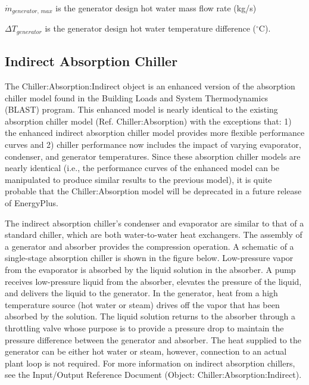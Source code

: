 \({\dot m_{generator,\,max}}\) is the generator design hot water mass flow rate (kg/s)

\(\Delta {T_{generator}}\) is the generator design hot water temperature difference (\(^{\circ}\)C).

\subsection{Indirect Absorption Chiller}\label{indirect-absorption-chiller}

The Chiller:Absorption:Indirect object is an enhanced version of the absorption chiller model found in the Building Loads and System Thermodynamics (BLAST) program. This enhanced model is nearly identical to the existing absorption chiller model (Ref. Chiller:Absorption) with the exceptions that: 1) the enhanced indirect absorption chiller model provides more flexible performance curves and 2) chiller performance now includes the impact of varying evaporator, condenser, and generator temperatures. Since these absorption chiller models are nearly identical (i.e., the performance curves of the enhanced model can be manipulated to produce similar results to the previous model), it is quite probable that the Chiller:Absorption model will be deprecated in a future release of EnergyPlus.

The indirect absorption chiller's condenser and evaporator are similar to that of a standard chiller, which are both water-to-water heat exchangers. The assembly of a generator and absorber provides the compression operation. A schematic of a single-stage absorption chiller is shown in the figure below. Low-pressure vapor from the evaporator is absorbed by the liquid solution in the absorber. A pump receives low-pressure liquid from the absorber, elevates the pressure of the liquid, and delivers the liquid to the generator. In the generator, heat from a high temperature source (hot water or steam) drives off the vapor that has been absorbed by the solution. The liquid solution returns to the absorber through a throttling valve whose purpose is to provide a pressure drop to maintain the pressure difference between the generator and absorber. The heat supplied to the generator can be either hot water or steam, however, connection to an actual plant loop is not required. For more information on indirect absorption chillers, see the Input/Output Reference Document (Object: Chiller:Absorption:Indirect).

